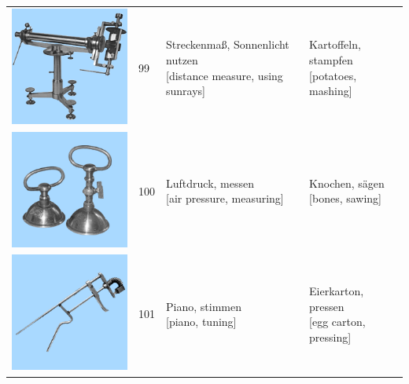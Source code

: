 \documentclass[
  english,
  man,floatsintext]{apa7}
\begin{document}
\begin{center}
\begin{ThreePartTable}
{\begin{longtable}{llll}
\includegraphics[valign=c, scale=0.23]{../materials/unfamiliar/99.png} & 99 & \makecell[l]{Streckenmaß, Sonnenlicht nutzen\\{[distance measure, using sunrays]}} & \makecell[l]{Kartoffeln, stampfen\\{[potatoes, mashing]}}\\
\includegraphics[valign=c, scale=0.23]{../materials/unfamiliar/100.png} & 100 & \makecell[l]{Luftdruck, messen\\{[air pressure, measuring]}} & \makecell[l]{Knochen, sägen\\{[bones, sawing]}}\\
\includegraphics[valign=c, scale=0.23]{../materials/unfamiliar/101.png} & 101 & \makecell[l]{Piano, stimmen\\{[piano, tuning]}} & \makecell[l]{Eierkarton, pressen\\{[egg carton, pressing]}}\\

\end{longtable}}
\end{ThreePartTable}
\end{center}
\end{document}
